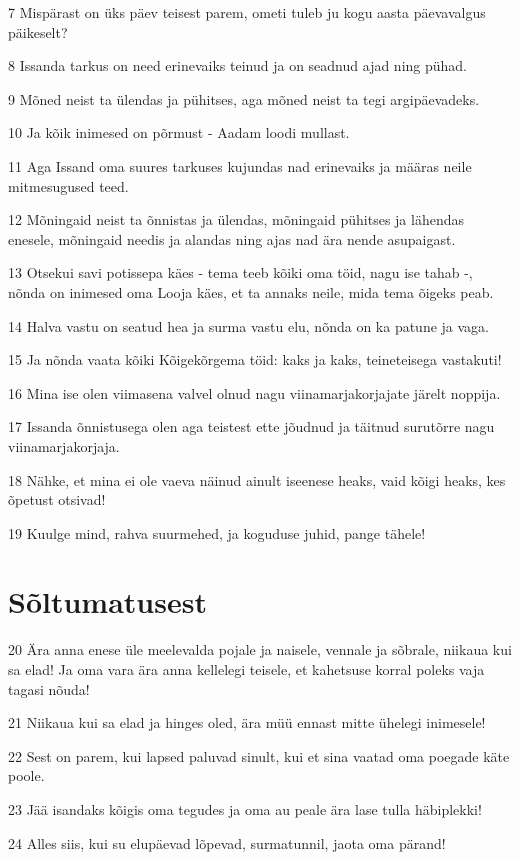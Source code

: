 \par 7 Mispärast on üks päev teisest parem, ometi tuleb ju kogu aasta päevavalgus päikeselt?
\par 8 Issanda tarkus on need erinevaiks teinud ja on seadnud ajad ning pühad.
\par 9 Mõned neist ta ülendas ja pühitses, aga mõned neist ta tegi argipäevadeks.
\par 10 Ja kõik inimesed on põrmust - Aadam loodi mullast.
\par 11 Aga Issand oma suures tarkuses kujundas nad erinevaiks ja määras neile mitmesugused teed.
\par 12 Mõningaid neist ta õnnistas ja ülendas, mõningaid pühitses ja lähendas enesele, mõningaid needis ja alandas ning ajas nad ära nende asupaigast.
\par 13 Otsekui savi potissepa käes - tema teeb kõiki oma töid, nagu ise tahab -, nõnda on inimesed oma Looja käes, et ta annaks neile, mida tema õigeks peab.
\par 14 Halva vastu on seatud hea ja surma vastu elu, nõnda on ka patune ja vaga.
\par 15 Ja nõnda vaata kõiki Kõigekõrgema töid: kaks ja kaks, teineteisega vastakuti!
\par 16 Mina ise olen viimasena valvel olnud nagu viinamarjakorjajate järelt noppija.
\par 17 Issanda õnnistusega olen aga teistest ette jõudnud ja täitnud surutõrre nagu viinamarjakorjaja.
\par 18 Nähke, et mina ei ole vaeva näinud ainult iseenese heaks, vaid kõigi heaks, kes õpetust otsivad!
\par 19 Kuulge mind, rahva suurmehed, ja koguduse juhid, pange tähele!

\section*{Sõltumatusest}

\par 20 Ära anna enese üle meelevalda pojale ja naisele, vennale ja sõbrale, niikaua kui sa elad! Ja oma vara ära anna kellelegi teisele, et kahetsuse korral poleks vaja tagasi nõuda!
\par 21 Niikaua kui sa elad ja hinges oled, ära müü ennast mitte ühelegi inimesele!
\par 22 Sest on parem, kui lapsed paluvad sinult, kui et sina vaatad oma poegade käte poole.
\par 23 Jää isandaks kõigis oma tegudes ja oma au peale ära lase tulla häbiplekki!
\par 24 Alles siis, kui su elupäevad lõpevad, surmatunnil, jaota oma pärand!

